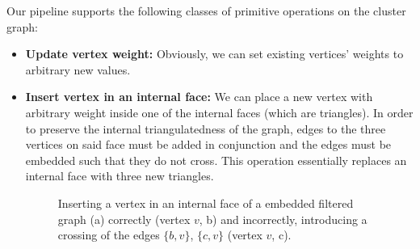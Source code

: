 \clearpage
{}
Our pipeline supports the following classes of primitive operations on the cluster graph:
%
\begin{itemize}
	\item \textbf{Update vertex weight:} Obviously, we can set existing vertices' weights to arbitrary new values.

	\item \textbf{Insert vertex in an internal face:} We can place a new vertex with arbitrary weight inside one of the internal faces (which are triangles). In order to preserve the internal triangulatedness of the graph, edges to the three vertices on said face must be added in conjunction and the edges must be embedded such that they do not cross. This operation essentially replaces an internal face with three new triangles.
\begin{figure}[H]
	\centering
	\quad
	\quad
	\caption{Inserting a vertex in an internal face of a embedded filtered graph (a) correctly (vertex $v$, b) and incorrectly, introducing a crossing of the edges $\{b,v\}$, $\{c,v\}$ (vertex $v$, c).}
	\label{fig:transformation}
\end{figure}


\end{itemize}
